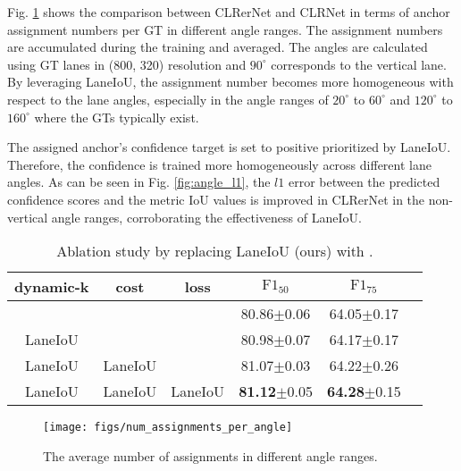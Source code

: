 \documentclass[10pt,twocolumn,letterpaper]{article}
\begin{document}
Fig. \ref{fig:angle_dependency} shows the comparison between CLRerNet and CLRNet in terms of anchor assignment numbers per GT in different angle ranges.
The assignment numbers are accumulated during the training and averaged.
The angles are calculated using GT lanes in (800, 320) resolution and $90^{\circ}$ corresponds to the vertical lane.
By leveraging LaneIoU, the assignment number becomes more homogeneous with respect to the lane angles, especially in the angle ranges of $20^{\circ}$ to $60^{\circ}$ and $120^{\circ}$ to $160^{\circ}$ where the GTs typically exist.

The assigned anchor's confidence target is set to positive prioritized by LaneIoU.
Therefore, the confidence is trained more homogeneously across different lane angles.
As can be seen in Fig. \ref{fig:angle_l1}, the $l1$ error between the predicted confidence scores and the metric IoU values is improved in CLRerNet in the non-vertical angle ranges, corroborating the effectiveness of LaneIoU.


\begin{table}
\begin{center}
\begin{adjustbox}{width=\linewidth} 
\begin{tabular}{cccccc}
\hline
dynamic-k & cost  & loss & $\text{F1}_{50}$ &  $\text{F1}_{75}$  \\
\hline
\cite{Zheng_2022_CVPR}  & \cite{Zheng_2022_CVPR}  &  \cite{Zheng_2022_CVPR}  & 80.86\footnotesize{$\pm$0.06} &64.05\footnotesize{$\pm$0.17} \\
LaneIoU & \cite{Zheng_2022_CVPR} & \cite{Zheng_2022_CVPR}  & 80.98\footnotesize{$\pm$0.07} &64.17\footnotesize{$\pm$0.17}  \\
LaneIoU & LaneIoU & \cite{Zheng_2022_CVPR}  & 81.07\footnotesize{$\pm$0.03} &64.22\footnotesize{$\pm$0.26}  \\
LaneIoU & LaneIoU  & LaneIoU & \textbf{81.12}\footnotesize{$\pm$0.05} & \textbf{64.28}\footnotesize{$\pm$0.15}  \\
\hline
\end{tabular}
\end{adjustbox}
\end{center}
\caption{Ablation study by replacing LaneIoU (ours) with \cite{Zheng_2022_CVPR}.}
\label{table:ablation}
\end{table}

\begin{figure}[t]
\begin{center}
 \texttt{[image: figs/num\_assignments\_per\_angle]}
\end{center}
   \caption{The average number of assignments in different angle ranges.}
\label{fig:angle_dependency}
\end{figure}
\end{document}
